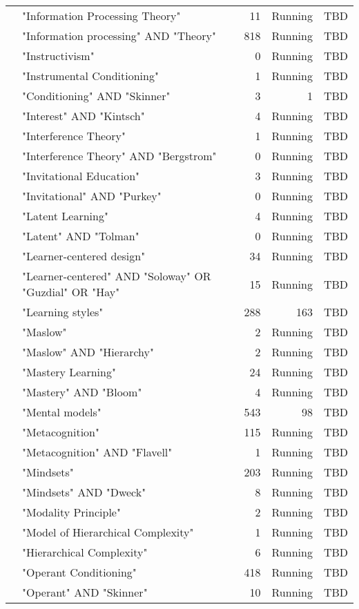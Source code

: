 \begin{table*}[t]
\begin{tabular}{lp{7cm}rrp{3cm}}
& "Information Processing Theory" & 11 & Running & TBD \\
& "Information processing" AND "Theory" & 818 & Running & TBD \\
& "Instructivism" & 0 & Running & TBD \\
& "Instrumental Conditioning" & 1 & Running & TBD \\
& "Conditioning" AND "Skinner" & 3 & 1 & TBD \\
& "Interest" AND "Kintsch" & 4 & Running & TBD \\
& "Interference Theory" & 1 & Running & TBD \\
& "Interference Theory" AND "Bergstrom" & 0 & Running & TBD \\
& "Invitational Education" & 3 & Running & TBD \\
& "Invitational" AND "Purkey" & 0 & Running & TBD \\
& "Latent Learning" & 4 & Running & TBD \\
& "Latent" AND "Tolman" & 0 & Running & TBD \\
& "Learner-centered design" & 34 & Running & TBD \\
& "Learner-centered" AND "Soloway" OR "Guzdial" OR "Hay" & 15 & Running & TBD \\
& "Learning styles" & 288 & 163 & TBD \\
& "Maslow" & 2 & Running & TBD \\
& "Maslow" AND "Hierarchy" & 2 & Running & TBD \\
& "Mastery Learning" & 24 & Running & TBD \\
& "Mastery" AND "Bloom" & 4 & Running & TBD \\
& "Mental models" & 543 & 98 & TBD \\
& "Metacognition" & 115 & Running & TBD \\
& "Metacognition" AND "Flavell" & 1 & Running & TBD \\
& "Mindsets" & 203 & Running & TBD \\
& "Mindsets" AND "Dweck" & 8 & Running & TBD \\
& "Modality Principle" & 2 & Running & TBD \\
& "Model of Hierarchical Complexity" & 1 & Running & TBD \\
& "Hierarchical Complexity" & 6 & Running & TBD \\
& "Operant Conditioning" & 418 & Running & TBD \\
& "Operant" AND "Skinner" & 10 & Running & TBD \\

\end{tabular}
\end{table*}
